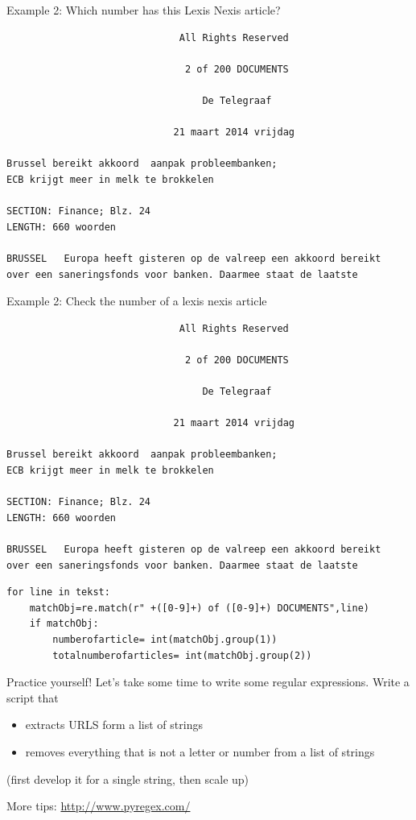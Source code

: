 \documentclass[handout]{beamer}
\begin{document}
\begin{frame}[fragile]{Example 2: Which number has this Lexis Nexis article?}
\begin{lstlisting}
                              All Rights Reserved

                               2 of 200 DOCUMENTS

                                  De Telegraaf

                             21 maart 2014 vrijdag

Brussel bereikt akkoord  aanpak probleembanken;
ECB krijgt meer in melk te brokkelen

SECTION: Finance; Blz. 24
LENGTH: 660 woorden

BRUSSEL   Europa heeft gisteren op de valreep een akkoord bereikt 
over een saneringsfonds voor banken. Daarmee staat de laatste
\end{lstlisting}

\end{frame}

\begin{frame}[fragile]{Example 2: Check the number of a lexis nexis article}
\begin{lstlisting}
                              All Rights Reserved

                               2 of 200 DOCUMENTS

                                  De Telegraaf

                             21 maart 2014 vrijdag

Brussel bereikt akkoord  aanpak probleembanken;
ECB krijgt meer in melk te brokkelen

SECTION: Finance; Blz. 24
LENGTH: 660 woorden

BRUSSEL   Europa heeft gisteren op de valreep een akkoord bereikt 
over een saneringsfonds voor banken. Daarmee staat de laatste
\end{lstlisting}

\begin{lstlisting}
for line in tekst:
    matchObj=re.match(r" +([0-9]+) of ([0-9]+) DOCUMENTS",line)
    if matchObj:
        numberofarticle= int(matchObj.group(1))
        totalnumberofarticles= int(matchObj.group(2))
\end{lstlisting}
\end{frame}


\begin{frame}{Practice yourself!}
	Let's take some time to write some regular expressions.
	Write a script that
\begin{itemize}
	\item extracts URLS form a list of strings
	\item removes everything that is not a letter or number from a list of strings
\end{itemize}
(first develop it for a single string, then scale up)

More tips:
\huge{\url{http://www.pyregex.com/}}
\end{frame}
\end{document}
